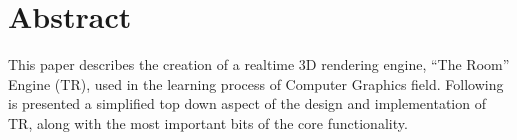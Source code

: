 \section{Abstract}

This paper describes the creation of a realtime 3D rendering engine, ``The Room'' Engine (TR),
used in the learning process of Computer Graphics field. Following is presented a simplified
top down aspect of the design and implementation of TR, along with the most important bits of
the core functionality.
